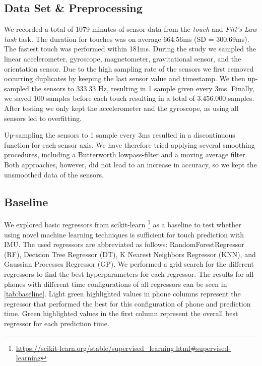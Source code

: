 \subsection{Data Set \& Preprocessing}
\label{sec:prepro}

We recorded a total of 1079 minutes of sensor data from the \textit{touch} and \textit{Fitt's Law task} task.
The duration for touches was on average 664.56ms (SD = 300.69ms).
The fastest touch was performed within 181ms.
During the study we sampled the linear accelerometer, gyroscope, magnetometer, gravitational sensor, and the orientation sensor.
Due to the high sampling rate of the sensors we first removed occurring duplicates by keeping the last sensor value and timestamp.
We then up-sampled the sensors to 333.33 Hz, resulting in 1 sample given every 3ms. 
Finally, we saved 100 samples before each touch resulting in a total of 3.456.000 samples.
After testing we only kept the accelerometer and the gyroscope, as using all sensors led to overfitting.

Up-sampling the sensors to 1 sample every 3ms resulted in a discontinuous function for each sensor axis. 
We have therefore tried applying several smoothing procedures, including a Butterworth lowpass-filter and a moving average filter.
Both approaches, however, did not lead to an increase in accuracy, so we kept the unsmoothed data of the sensors.

\subsection{Baseline}
We explored basic regressors from scikit-learn \footnote{\url{https://scikit-learn.org/stable/supervised\_learning.html\#supervised-learning}} as a baseline to test whether using novel machine learning techniques is sufficient for touch prediction with IMU.
The used regressors are abbreviated as follows: RandomForestRegressor (RF), Decision Tree Regressor (DT), K Nearest Neighbors Regressor (KNN), and Gaussian Processes Regressor (GP).
We performed a grid search for the different regressors to find the best hyperparameters for each regressor.
The results for all phones with different time configurations of all regressors can be seen in \cref{tab:baseline}.
Light green highlighted values in phone columns represent the regressor that performed the best for this configuration of phone and prediction time.
Green highlighted values in the first column represent the overall best regressor for each prediction time.

